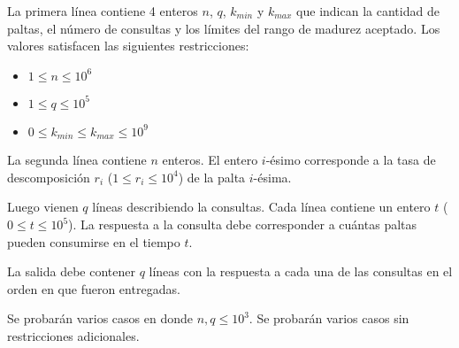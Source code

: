 \documentclass{oci}
\begin{document}
\begin{inputDescription}

La primera línea contiene 4 enteros
$n$, $q$, $k_{min}$ y $k_{max}$
que indican la cantidad de paltas, el número de consultas y los límites del rango de madurez aceptado.
Los valores satisfacen las siguientes restricciones:

\begin{itemize}
  \item $1 \leq n \leq 10^6$
  \item $1 \leq q \leq 10^5$
  \item $0 \leq k_{min} \leq k_{max} \leq 10^9$
\end{itemize}

La segunda línea contiene $n$ enteros.
El entero $i$-ésimo corresponde a la tasa de descomposición $r_i$ ($1 \leq r_i \leq 10^4$)
de la palta $i$-ésima.

Luego vienen $q$ líneas describiendo la consultas.
Cada línea contiene un entero $t$ ($0 \leq t \leq 10^5$).
La respuesta a la consulta debe corresponder a cuántas paltas pueden consumirse
en el tiempo $t$.

\end{inputDescription}

\begin{outputDescription}
La salida debe contener $q$ líneas con la respuesta a cada una de las consultas en el orden en que
fueron entregadas.
\end{outputDescription}

\begin{scoreDescription}
  Se probarán varios casos en donde $n, q \leq 10^3$.
  Se probarán varios casos sin restricciones adicionales.
\end{scoreDescription}
\end{document}
